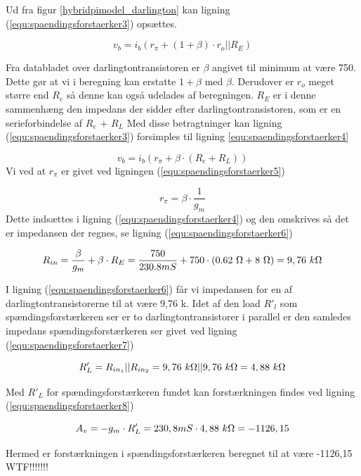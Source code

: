 Ud fra figur \ref{hybridpimodel_darlington} kan ligning (\ref{equ:spaendingsforstaerker3}) opsættes.

\begin{equation}
\label{equ:spaendingsforstaerker3}
v_b = i_b (r_{\pi} + (1+\beta) \cdot r_o||R_E) 
\end{equation}

Fra databladet over darlingtontransistoren er $\beta$ angivet til minimum at være 750. Dette gør at vi i beregning kan erstatte $1+\beta$ med $\beta$. Derudover er $r_o$ meget større end $R_e$ så denne kan også udelades af beregningen. $R_E$ er i denne sammenhæng den impedans der sidder efter darlingtontransistoren, som er en serieforbindelse af $R_e$ + $R_L$ Med disse betragtninger kan ligning (\ref{equ:spaendingsforstaerker3}) forsimples til ligning \ref{equ:spaendingsforstaerker4}

\begin{equation}
\label{equ:spaendingsforstaerker4}
v_b = i_b (r_{\pi} + \beta \cdot (R_e + R_L))
\end{equation}
Vi ved at $r_{\pi}$ er givet ved ligningen (\ref{equ:spaendingsforstaerker5})

\begin{equation}
\label{equ:spaendingsforstaerker5}
r_{\pi} = \beta \cdot \frac{1}{g_m}
\end{equation}
Dette indsættes i ligning (\ref{equ:spaendingsforstaerker4}) og den omskrives så det er impedansen der regnes, se ligning (\ref{equ:spaendingsforstaerker6})

\begin{equation}
\label{equ:spaendingsforstaerker6}
R_{in} = \frac{\beta}{g_m} + \beta \cdot R_E = \frac{750}{230.8 mS} + 750 \cdot (0.62~\ohm + 8~\ohm) = 9,76~k\ohm  
\end{equation}

I ligning (\ref{equ:spaendingsforstaerker6}) får vi impedansen for en af darlingtontransistorerne til at være 9,76 k\ohm. Idet af den load $R'_l$ som spændingsforstærkeren ser er to darlingtontransistorer i parallel er den samledes impedans spændingsforstærkeren ser givet ved ligning (\ref{equ:spaendingsforstaerker7})

\begin{equation}
\label{equ:spaendingsforstaerker7}
R'_L = R_{in_1}||R_{in_2} = 9,76~k\ohm||9,76~k\ohm = 4,88~k\ohm
\end{equation}  

Med $R'_L$ for spændingsforstærkeren fundet kan forstærkningen findes ved ligning (\ref{equ:spaendingsforstaerker8})

\begin{equation}
\label{equ:spaendingsforstaerker8}
A_v = -g_m \cdot R'_L = 230,8 mS \cdot 4,88~k\ohm = -1126,15
\end{equation}

Hermed er forstærkningen i spændingsforstærkeren beregnet til at være -1126,15 WTF!!!!!!!